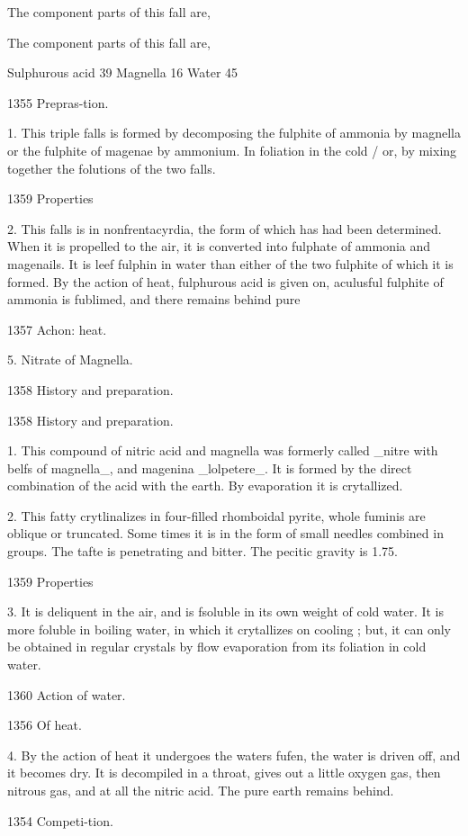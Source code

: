 \documentclass{article}
\begin{document}
The component parts of this fall are,

The component parts of this fall are,

Sulphurous acid 39
Magnella 16
Water 45

1355
Prepras-tion.

1. This triple falls is formed by decomposing the fulphite of ammonia by magnella or the fulphite of magenae by ammonium. In foliation in the cold / or, by mixing together the folutions of the two falls.

1359
Properties

2. This falls is in nonfrentacyrdia, the form of which has had been determined. When it is propelled to the air, it is converted into fulphate of ammonia and magenails. It is leef fulphin in water than either of the two fulphite of which it is formed. By the action of heat, fulphurous acid is given on, aculusful fulphite of ammonia is fublimed, and there remains behind pure

1357
Achon:
heat.

5. Nitrate of Magnella.

1358
History and preparation.

1358
History and preparation.

1. This compound of nitric acid and magnella was formerly called \_nitre with belfs of magnella\_, and magenina \_lolpetere\_. It is formed by the direct combination of the acid with the earth. By evaporation it is crytallized.

2. This fatty crytlinalizes in four-filled rhomboidal pyrite, whole fuminis are oblique or truncated. Some times it is in the form of small needles combined in groups. The tafte is penetrating and bitter. The pecitic gravity is 1.75.

1359
Properties

3. It is deliquent in the air, and is fsoluble in its own weight of cold water. It is more foluble in boiling water, in which it crytallizes on cooling ; but, it can only be obtained in regular crystals by flow evaporation from its foliation in cold water.

1360
Action of
water.

1356
Of heat.

4. By the action of heat it undergoes the waters fufen, the water is driven off, and it becomes dry. It is decompiled in a throat, gives out a little oxygen gas, then nitrous gas, and at all the nitric acid. The pure earth remains behind.

1354
Competi-tion.
\end{document}
